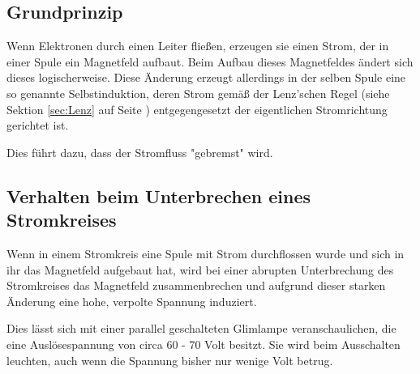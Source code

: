 \subsection{Grundprinzip}

Wenn Elektronen durch einen Leiter fließen, erzeugen sie einen Strom, der in einer Spule ein Magnetfeld aufbaut. Beim Aufbau dieses Magnetfeldes ändert sich dieses logischerweise. Diese Änderung erzeugt allerdings in der selben Spule eine so genannte Selbstinduktion, deren Strom gemäß der Lenz'schen Regel (siehe Sektion \ref{sec:Lenz} auf Seite \pageref{sec:Lenz}) entgegengesetzt der eigentlichen Stromrichtung gerichtet ist.

Dies führt dazu, dass der Stromfluss "gebremst" wird.

\subsection{Verhalten beim Unterbrechen eines Stromkreises}

Wenn in einem Stromkreis eine Spule mit Strom durchflossen wurde und sich in ihr das Magnetfeld aufgebaut hat, wird bei einer abrupten Unterbrechung des Stromkreises das Magnetfeld zusammenbrechen und aufgrund dieser starken Änderung eine hohe, verpolte Spannung induziert.

Dies lässt sich mit einer parallel geschalteten Glimlampe veranschaulichen, die eine Auslösespannung von circa 60 - 70 Volt besitzt. Sie wird beim Ausschalten leuchten, auch wenn die Spannung bisher nur wenige Volt betrug.